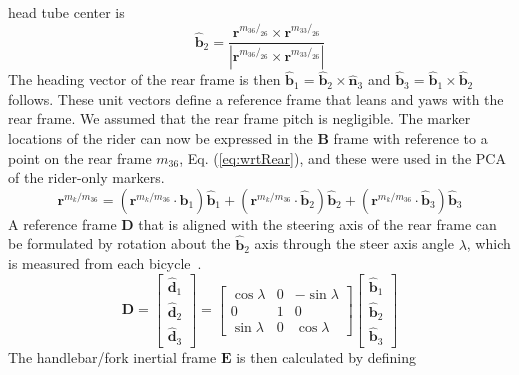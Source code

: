 \begin{appendices}
head tube center is
\begin{equation}
\hat{\mathbf{b}}_2=
\frac{\mathbf{r}^{{m_{36}}/_{26}}\times\mathbf{r}^{{m_{33}}/_{26}}}
{|\mathbf{r}^{{m_{36}}/_{26}}\times\mathbf{r}^{{m_{33}}/_{26}}|}
\label{eq:b2}
\end{equation}
The heading vector of the rear frame is then
$\hat{\mathbf{b}}_1=\hat{\mathbf{b}}_2\times\hat{\mathbf{n}}_3$ and
$\hat{\mathbf{b}}_3=\hat{\mathbf{b}}_1\times\hat{\mathbf{b}}_2$ follows. These
unit vectors define a reference frame that leans and yaws with the rear frame.
We assumed that the rear frame pitch is negligible. The marker locations of the
rider can now be expressed in the $\mathbf{B}$ frame with reference to a point
on the rear frame $m_{36}$, Eq. (\ref{eq:wrtRear}), and these were used in the
PCA of the rider-only markers.
\begin{equation}
    \mathbf{r}^{{m_{k}}/m_{36}}=
    (\mathbf{r}^{{m_{k}}/m_{36}}\cdot\hat{\mathbf{b}}_1)\hat{\mathbf{b}}_1+
    (\mathbf{r}^{{m_{k}}/m_{36}}\cdot\hat{\mathbf{b}}_2)\hat{\mathbf{b}}_2+
    (\mathbf{r}^{{m_{k}}/m_{36}}\cdot\hat{\mathbf{b}}_3)\hat{\mathbf{b}}_3
\label{eq:wrtRear}
\end{equation}
A reference frame $\mathbf{D}$ that is aligned with the steering axis of the
rear frame can be formulated by rotation about the $\hat{\mathbf{b}}_2$ axis
through the steer axis angle $\lambda$, which is measured from each
bicycle~\cite{Moore2009a}.
\begin{equation}
    \mathbf{D}=
    \left[
    \begin{array}{c}
    \hat{\mathbf{d}}_1\\
    \hat{\mathbf{d}}_2\\
    \hat{\mathbf{d}}_3
  \end{array}
    \right]
    =
    \left[
    \begin{array}{rrr}
    \cos{\lambda} &  0 &  -\sin{\lambda}\\
    0             &  1 &  0\\
    \sin{\lambda} &  0 & \cos{\lambda}
    \end{array}
    \right]
    \left[
    \begin{array}{c}
    \hat{\mathbf{b}}_1\\
    \hat{\mathbf{b}}_2\\
    \hat{\mathbf{b}}_3
  \end{array}
    \right]
\label{eq:Dframe}
\end{equation}
The handlebar/fork inertial frame $\mathbf{E}$ is then calculated by defining

\end{appendices}
